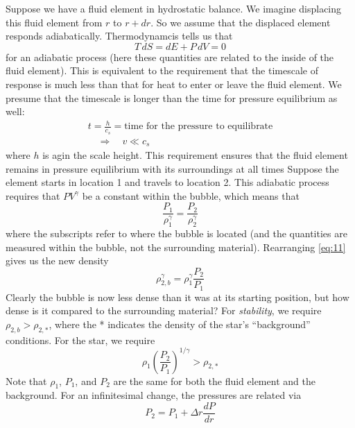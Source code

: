 \documentclass[10pt]{article}
\numberwithin{equation}{section}
\newcommand{\n}{\noindent}
\begin{document}
\n Suppose we have a fluid element in hydrostatic balance. We imagine
displacing this fluid element from $r$ to $r+dr$. So we assume that
the displaced element responds adiabatically. Thermodynamcis tells us
that
\begin{equation}
  \label{eq:9}
  T\,dS=dE+P\,dV=0
\end{equation}
for an adiabatic process (here these quantities are related to the
inside of the fluid element). This is equivalent to the requirement that
the timescale of response is much less than that for heat to enter or
leave the fluid element. We presume that the timescale is longer than
the time for pressure equilibrium as well:
\begin{multline}
  \label{eq:10}
  t=\frac{h}{c_s}=\textrm{time for the pressure to
    equilibrate}\\
		\quad\Rightarrow\quad v\ll c_s
\end{multline}
where $h$ is agin the scale height. This requirement ensures that the
fluid element remains in pressure equilibrium with its surroundings at
all times Suppose the element starts in
location 1 and travels to location 2. This adiabatic process requires
that $PV^\gamma$ be a constant within the bubble, which means that
\begin{equation}
  \label{eq:11}
  \frac{P_1}{\rho_1^\gamma}=\frac{P_2}{\rho_2^\gamma}
\end{equation}
where the subscripts refer to where the bubble is located (and the
quantities are measured within the bubble, not the surrounding
material). Rearranging
\eqref{eq:11} gives us the new density
\begin{equation}
  \label{eq:12}
  \rho_{2,b}^\gamma=\rho_1^\gamma\frac{P_2}{P_1}
\end{equation}
Clearly the bubble is now less dense than it was at its starting
position, but how dense is it compared to the surrounding material?
For \emph{stability}, we require $\rho_{2,b}>\rho_{2,*}$, where the * 
indicates the
density of the star's ``background'' conditions. For the star, we
require
\begin{equation}
  \label{eq:13}
  \rho_1\left(\frac{P_2}{P_1}\right)^{1/\gamma}>\rho_{2,*}
\end{equation}
Note that $\rho_1$, $P_1$, and $P_2$ are the same for both the fluid
element and the background. For an infinitesimal change, the pressures
are related via
\begin{equation}
  \label{eq:14}
  P_2=P_1+\Delta r\frac{dP}{dr}
\end{equation}
\end{document}
